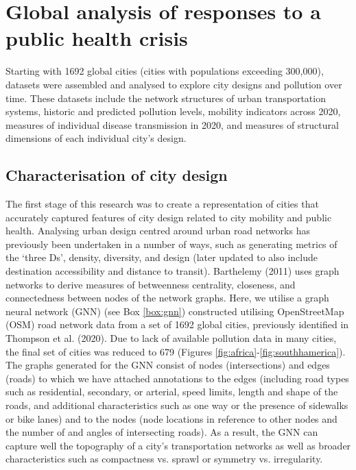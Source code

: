 \documentclass[preprint,10pt]{elsarticle} %
\begin{document}
\section*{\textcolor{OliveGreen}{Global analysis of responses to a public health crisis}}

Starting with 1692 global cities (cities with populations exceeding 300,000\cite{UNDESA2019}), datasets were assembled and analysed to explore city designs and pollution over time. These datasets include the network structures of urban transportation systems, historic and predicted pollution levels, mobility indicators across 2020, measures of individual disease transmission in 2020, and measures of structural dimensions of each individual city's design.

\subsection*{Characterisation of city design}
The first stage of this research was to create a representation of cities that accurately captured features of city design related to city mobility and public health. Analysing urban design centred around urban road networks has previously been undertaken in a number of ways, such as generating metrics of the `three Ds'\cite{Ewing2010}, density, diversity, and design (later updated to also include destination accessibility and distance to transit). Barthelemy (2011)\cite{Barthelemy2011} uses graph networks to derive measures of betweenness centrality, closeness, and connectedness between nodes of the network graphs. Here, we utilise a graph neural network (GNN) (see Box \ref{box:gnn}) constructed utilising OpenStreetMap (OSM) road network data\cite{Boeing2017a} from a set of 1692 global cities, previously identified in Thompson et al. (2020)\cite{Thompson2020}. Due to lack of available pollution data in many cities, the final set of cities was reduced to 679 (Figures \ref{fig:africa}-\ref{fig:southhamerica}). The graphs generated for the GNN consist of nodes (intersections) and edges (roads) to which we have attached annotations to the edges (including road types such as residential, secondary, or arterial, speed limits, length and shape of the roads, and additional characteristics such as one way or the presence of sidewalks or bike lanes) and to the nodes (node locations in reference to other nodes and the number of and angles of intersecting roads). As a result, the GNN can capture well the topography of a city's transportation networks as well as broader characteristics such as compactness vs. sprawl or symmetry vs. irregularity.  
\end{document}
